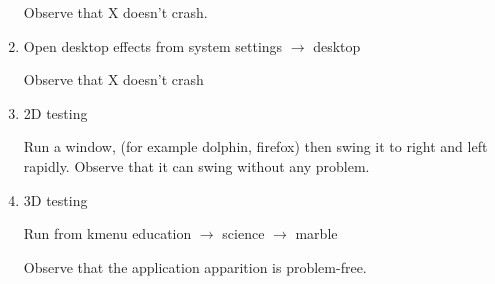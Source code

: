 \documentclass[a4paper,10pt]{article}
\begin{document}
\begin{enumerate}
      Observe that X doesn't crash.
 \item Open desktop effects from system settings $\rightarrow$ desktop
 
      Observe that X doesn't crash
  \item 2D testing 
      
      Run a window, (for example dolphin, firefox) then swing it to right and left rapidly.
        Observe that it can swing without any problem.

 \item 3D testing

    Run from kmenu education $\rightarrow$ science $\rightarrow$ marble
	
    Observe that the application apparition is problem-free.
\end{enumerate}
\end{document}
